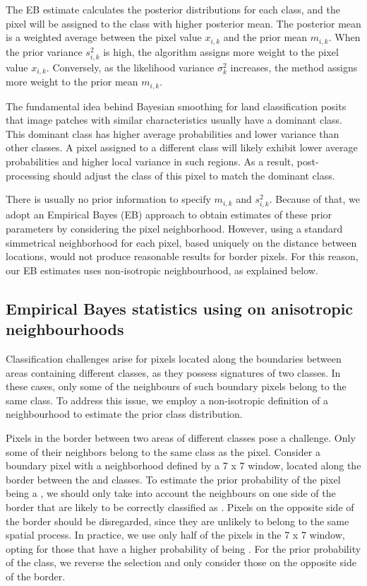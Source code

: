\documentclass[
  shortnames]{jss}
\begin{document}
The EB estimate calculates the posterior distributions for each class, and the pixel will be assigned to the class with higher posterior mean. The posterior mean is a weighted average between the pixel value \(x_{i,k}\) and the prior mean \(m_{i,k}\). When the prior variance \(s^2_{i,k}\) is high, the algorithm assigns more weight to the pixel value \(x_{i,k}\). Conversely, as the likelihood variance \(\sigma^2_k\) increases, the method assigns more weight to the prior mean \(m_{i,k}\).

The fundamental idea behind Bayesian smoothing for land classification posits that image patches with similar characteristics usually have a dominant class. This dominant class has higher average probabilities and lower variance than other classes. A pixel assigned to a different class will likely exhibit lower average probabilities and higher local variance in such regions. As a result, post-processing should adjust the class of this pixel to match the dominant class.

There is usually no prior information to specify \(m_{i,k}\) and \(s^2_{i,k}\). Because of that, we adopt an Empirical Bayes (EB) approach to obtain estimates of these prior parameters by considering the pixel neighborhood. However, using a standard simmetrical neighborhood for each pixel, based uniquely on the distance between locations, would not produce reasonable results for border pixels. For this reason, our EB estimates uses non-isotropic neighbourhood, as explained below.

\subsection{Empirical Bayes statistics using on anisotropic neighbourhoods}\label{empirical-bayes-statistics-using-on-anisotropic-neighbourhoods}

Classification challenges arise for pixels located along the boundaries between areas containing different classes, as they possess signatures of two classes. In these cases, only some of the neighbours of such boundary pixels belong to the same class. To address this issue, we employ a non-isotropic definition of a neighbourhood to estimate the prior class distribution.

Pixels in the border between two areas of different classes pose a challenge. Only some of their neighbors belong to the same class as the pixel. Consider a boundary pixel with a neighborhood defined by a 7 x 7 window, located along the border between the  and  classes. To estimate the prior probability of the pixel being a , we should only take into account the neighbours on one side of the border that are likely to be correctly classified as . Pixels on the opposite side of the border should be disregarded, since they are unlikely to belong to the same spatial process. In practice, we use only half of the pixels in the 7 x 7 window, opting for those that have a higher probability of being . For the prior probability of the  class, we reverse the selection and only consider those on the opposite side of the border.
\end{document}
